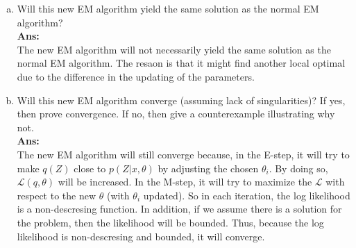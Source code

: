 \documentclass[11pt]{article}
\begin{document}
\begin{enumerate}[(a)]
\item Will this new EM algorithm yield the same solution as the normal EM algorithm?\\
\textbf{Ans:}\\
The new EM algorithm will not necessarily yield the same solution as the normal EM algorithm. The resaon is that it might find another local optimal due to the difference in the updating of the parameters. 

\item Will this new EM algorithm converge (assuming lack of singularities)? If yes, then prove convergence. If no, then give a counterexample illustrating why not.\\
\textbf{Ans:}\\
The new EM algorithm will still converge because, in the E-step, it will try to make $q(Z)$ close to $p(Z|x, \theta)$ by adjusting the chosen $\theta_i$. By doing so, $\mathcal{L}(q, \theta)$ will be increased. In the M-step, it will try to maximize the $\mathcal{L}$ with respect to the new $\theta$ (with $\theta_i$ updated). So in each iteration, the log likelihood is a non-descresing function. In addition, if we assume there is a solution for the problem, then the likelihood will be bounded. Thus, because the log likelihood is non-descresing and bounded, it will converge.  

\end{enumerate}
\end{document}
